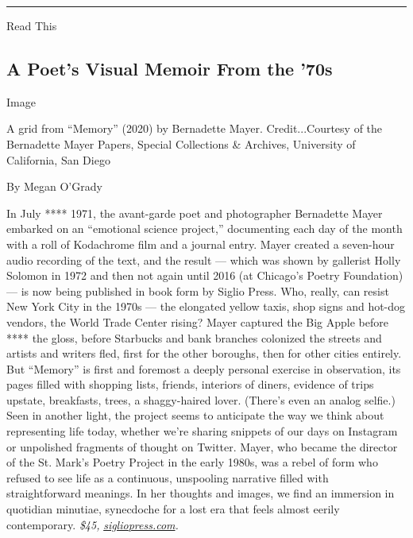 \begin{center}\rule{0.5\linewidth}{\linethickness}\end{center}

Read This

\hypertarget{a-poets-visual-memoir-from-the-70s}{%
\subsection{A Poet's Visual Memoir From the
'70s}\label{a-poets-visual-memoir-from-the-70s}}

Image

A grid from ``Memory'' (2020) by Bernadette Mayer. Credit...Courtesy of
the Bernadette Mayer Papers, Special Collections \& Archives, University
of California, San Diego

By Megan O'Grady

In July **** 1971, the avant-garde poet and photographer Bernadette
Mayer embarked on an ``emotional science project,'' documenting each day
of the month with a roll of Kodachrome film and a journal entry. Mayer
created a seven-hour audio recording of the text, and the result ---
which was shown by gallerist Holly Solomon in 1972 and then not again
until 2016 (at Chicago's Poetry Foundation) --- is now being published
in book form by Siglio Press. Who, really, can resist New York City in
the 1970s --- the elongated yellow taxis, shop signs and hot-dog
vendors, the World Trade Center rising? Mayer captured the Big Apple
before **** the gloss, before Starbucks and bank branches colonized the
streets and artists and writers fled, first for the other boroughs, then
for other cities entirely. But ``Memory'' is first and foremost a deeply
personal exercise in observation, its pages filled with shopping lists,
friends, interiors of diners, evidence of trips upstate, breakfasts,
trees, a shaggy-haired lover. (There's even an analog selfie.) Seen in
another light, the project seems to anticipate the way we think about
representing life today, whether we're sharing snippets of our days on
Instagram or unpolished fragments of thought on Twitter. Mayer, who
became the director of the St. Mark's Poetry Project in the early 1980s,
was a rebel of form who refused to see life as a continuous, unspooling
narrative filled with straightforward meanings. In her thoughts and
images, we find an immersion in quotidian minutiae, synecdoche for a
lost era that feels almost eerily contemporary. \emph{\$45,}
\href{http://sigliopress.com/book/memory/}{\emph{sigliopress.com}}\emph{.}

